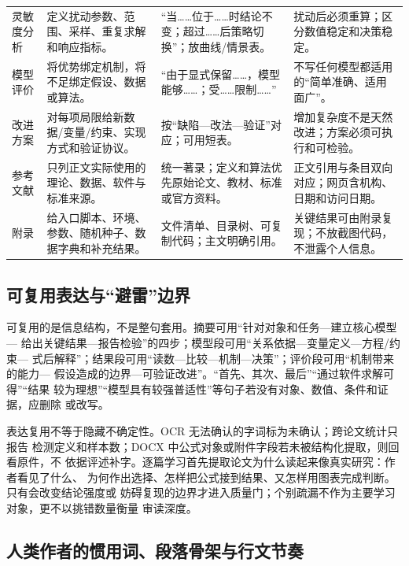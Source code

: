 \documentclass[UTF8,a4paper,12pt]{ctexart}
\begin{document}
\begin{longtable}{p{1.8cm}p{4.2cm}p{4.0cm}p{4.0cm}}
灵敏度分析 & 定义扰动参数、范围、采样、重复求解和响应指标。 & “当……位于……时结论不变；超过……后策略切换”；放曲线/情景表。 & 扰动后必须重算；区分数值稳定和决策稳定。\\
模型评价 & 将优势绑定机制，将不足绑定假设、数据或算法。 & “由于显式保留……，模型能够……；受……限制……” & 不写任何模型都适用的“简单准确、适用面广”。\\
改进方案 & 对每项局限给新数据/变量/约束、实现方式和验证协议。 & 按“缺陷—改法—验证”对应；可用短表。 & 增加复杂度不是天然改进；方案必须可执行和可检验。\\
参考文献 & 只列正文实际使用的理论、数据、软件与标准来源。 & 统一著录；定义和算法优先原始论文、教材、标准或官方资料。 & 正文引用与条目双向对应；网页含机构、日期和访问日期。\\
附录 & 给入口脚本、环境、参数、随机种子、数据字典和补充结果。 & 文件清单、目录树、可复制代码；主文明确引用。 & 关键结果可由附录复现；不放截图代码，不泄露个人信息。\\
\bottomrule
\end{longtable}

\subsection{可复用表达与“避雷”边界}

可复用的是信息结构，不是整句套用。摘要可用“针对对象和任务—建立核心模型—
给出关键结果—报告检验”的四步；模型段可用“关系依据—变量定义—方程/约束—
式后解释”；结果段可用“读数—比较—机制—决策”；评价段可用“机制带来的能力—
假设造成的边界—可验证改进”。“首先、其次、最后”“通过软件求解可得”“结果
较为理想”“模型具有较强普适性”等句子若没有对象、数值、条件和证据，应删除
或改写。

表达复用不等于隐藏不确定性。OCR 无法确认的字词标为未确认；跨论文统计只报告
检测定义和样本数；DOCX 中公式对象或附件字段若未被结构化提取，则回看原件，不
依据评述补字。逐篇学习首先提取论文为什么读起来像真实研究：作者看见了什么、
为何作出选择、怎样把公式接到结果、又怎样用图表完成判断。只有会改变结论强度或
妨碍复现的边界才进入质量门；个别疏漏不作为主要学习对象，更不以挑错数量衡量
审读深度。

\subsection{人类作者的惯用词、段落骨架与行文节奏}
\end{document}
